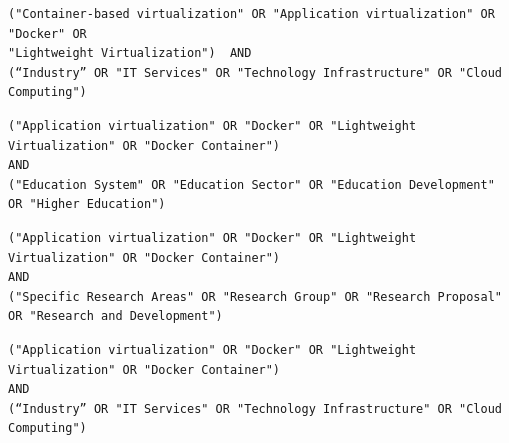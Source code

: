 \begin{tcolorbox}[
		colback=gray!5,
		colframe=black!60,
		title=Cadena de búsqueda en Science Direct para extensión,
		fonttitle=\bfseries,
		sharp corners=south
	]
	\scriptsize %
	\begin{verbatim}
("Container-based virtualization" OR "Application virtualization" OR "Docker" OR 
"Lightweight Virtualization")  AND 
(“Industry” OR "IT Services" OR "Technology Infrastructure" OR "Cloud Computing")
\end{verbatim}
\end{tcolorbox}

\begin{tcolorbox}[
		colback=gray!5,
		colframe=black!60,
		title=Cadena de búsqueda en Taylor \& Francis para educación,
		fonttitle=\bfseries,
		sharp corners=south
	]
	\scriptsize %
	\begin{verbatim}
("Application virtualization" OR "Docker" OR "Lightweight Virtualization" OR "Docker Container")   
AND   
("Education System" OR "Education Sector" OR "Education Development" OR "Higher Education")
\end{verbatim}
\end{tcolorbox}

\begin{tcolorbox}[
		colback=gray!5,
		colframe=black!60,
		title=Cadena de búsqueda en Taylor \& Francis para investigación,
		fonttitle=\bfseries,
		sharp corners=south
	]
	\scriptsize %
	\begin{verbatim}
("Application virtualization" OR "Docker" OR "Lightweight Virtualization" OR "Docker Container")
AND   
("Specific Research Areas" OR "Research Group" OR "Research Proposal" OR "Research and Development")
\end{verbatim}
\end{tcolorbox}

\begin{tcolorbox}[
		colback=gray!5,
		colframe=black!60,
		title=Cadena de búsqueda en Taylor \& Francis para extensión,
		fonttitle=\bfseries,
		sharp corners=south
	]
	\scriptsize %
	\begin{verbatim}
("Application virtualization" OR "Docker" OR "Lightweight Virtualization" OR "Docker Container")  
AND 
(“Industry” OR "IT Services" OR "Technology Infrastructure" OR "Cloud Computing")
\end{verbatim}
\end{tcolorbox}


